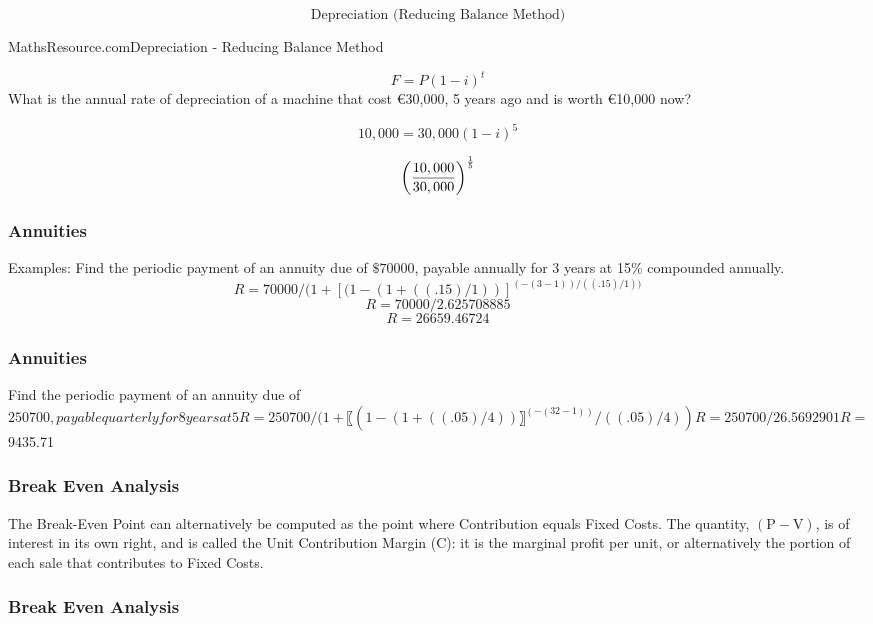 \documentclass{beamer}
\begin{document}
\begin{frame}
\Large
\[\mbox{Depreciation (Reducing Balance Method)}\]
\end{frame}

\begin{frame}{MathsResource.com}{Depreciation - Reducing Balance Method}
\Large

\[F = P(1-i)^t \]
What is the annual rate of depreciation of a 
machine that cost €30,000, 5 years ago and is 
worth €10,000 now?


\[10,000 = 30,000(1-i)^5 \] 

\[ \left(\frac{10,000}{30,000} \right)^{{1\over 5}} \]
\end{frame}

\begin{frame}
\frametitle{Annuities}
Examples:
Find the periodic payment of an annuity due of $\$70000$, payable annually for 3 years at 15\% compounded annually.
\[R = 70000/(1+[(1-(1+((.15)/1) )]^{(-(3-1))/((.15)/1))}\]
\[R = 70000/2.625708885\]
\[R = 26659.46724\]
\end{frame}

\begin{frame}
\frametitle{Annuities}
Find the periodic payment of an annuity due of $250700, payable quarterly for 8 years at 5%
R= 250700/(1+〖(1-(1+((.05)/4) )〗^(-(32-1))/((.05)/4))
R = 250700/26.5692901
R = $9435.71
\end{frame}

\begin{frame}
\frametitle{Break Even Analysis}

The Break-Even Point can alternatively be computed as the point where Contribution equals Fixed Costs.
The quantity, $\left(\text{P} - \text{V}\right)$, is of interest in its own right, and is called the Unit Contribution Margin (C): it is the marginal profit per unit, or alternatively the portion of each sale that contributes to Fixed Costs. 
\end{frame}

\begin{frame}
\frametitle{Break Even Analysis}

\end{frame}
\end{document}
